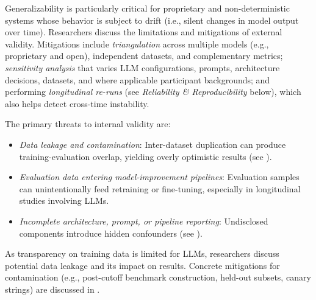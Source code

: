 Generalizability is particularly critical for proprietary and non-deterministic systems whose behavior is subject to drift (i.e., silent changes in model output over time). Researchers \must discuss the limitations and mitigations of external validity.
Mitigations include \emph{triangulation} across multiple models (e.g., proprietary and open), independent datasets, and complementary metrics; \emph{sensitivity analysis} that varies LLM configurations, prompts, architecture decisions, datasets, and where applicable participant backgrounds; and performing \emph{longitudinal re-runs} (see \emph{Reliability \& Reproducibility} below), which also helps detect cross-time instability.

The primary threats to internal validity are:
\begin{itemize}
	\item \emph{Data leakage and contamination}: Inter-dataset duplication can produce training-evaluation overlap, yielding overly optimistic results (see \benchmarksmetrics).
	\item \emph{Evaluation data entering model-improvement pipelines}: Evaluation samples can unintentionally feed retraining or fine-tuning, especially in longitudinal studies involving LLMs.
	\item \emph{Incomplete architecture, prompt, or pipeline reporting}: Undisclosed components introduce hidden confounders (see \design).
\end{itemize}

As transparency on training data is limited for LLMs, researchers \must discuss potential data leakage and its impact on results. Concrete mitigations for contamination (e.g., post-cutoff benchmark construction, held-out subsets, canary strings) are discussed in \benchmarksmetrics.

